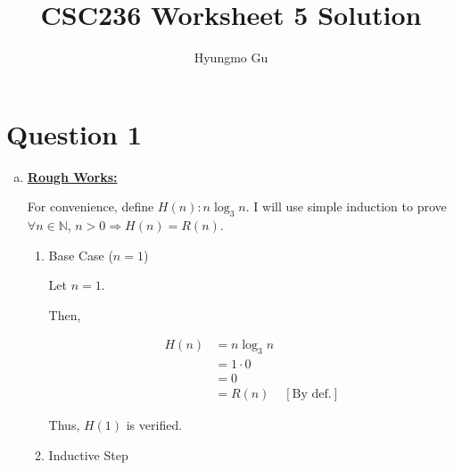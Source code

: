 \documentclass[12pt]{article}
\begin{document}
\title{CSC236 Worksheet 5 Solution}
\author{Hyungmo Gu}
\maketitle

\section*{Question 1}
\begin{enumerate}[a.]
    \item

    \bigskip

    \begin{mdframed}
        \underline{\textbf{Rough Works:}}

        \bigskip

        For convenience, define $H(n): n\log_3 n$. I will use simple induction
        to prove $\forall n \in \mathbb{N}$, $n > 0 \Rightarrow H(n) = R(n)$.

        \bigskip

        \begin{enumerate}[1.]
            \item Base Case ($n = 1$)

            \begin{mdframed}
            Let $n = 1$.

            \bigskip

            Then,

            \begin{align}
                H(n) &= n \log_3 n\\
                &= 1 \cdot 0\\
                &= 0\\
                &= R(n) & [\text{By def.}]
            \end{align}

            Thus, $H(1)$ is verified.

            \end{mdframed}

            \item Inductive Step
        \end{enumerate}

    \end{mdframed}

\end{enumerate}
\end{document}
